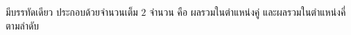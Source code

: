 \large{มีบรรทัดเดียว ประกอบด้วยจำนวนเต็ม $2$ จำนวน คือ ผลรวมในตำแหน่งคู่ และผลรวมในตำแหน่งคี่ ตามลำดับ}